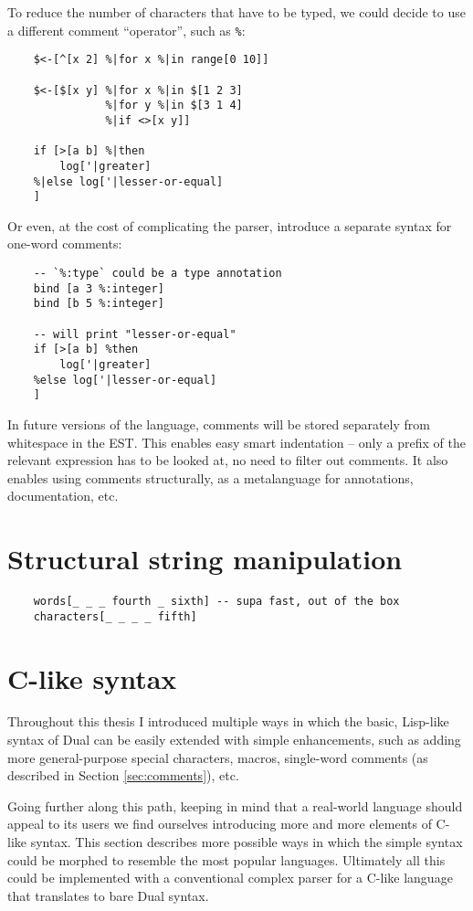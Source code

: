 To reduce the number of characters that have to be typed, we could decide to use a different comment ``operator'', such as \texttt{\%}:
\begin{lstlisting}
    $<-[^[x 2] %|for x %|in range[0 10]]
    
    $<-[$[x y] %|for x %|in $[1 2 3]
               %|for y %|in $[3 1 4]
               %|if <>[x y]]

    if [>[a b] %|then
        log['|greater]
    %|else log['|lesser-or-equal]
    ]
\end{lstlisting}

Or even, at the cost of complicating the parser, introduce a separate syntax for one-word comments:
\begin{lstlisting}
    -- `%:type` could be a type annotation 
    bind [a 3 %:integer]
    bind [b 5 %:integer]

    -- will print "lesser-or-equal"
    if [>[a b] %then
        log['|greater]
    %else log['|lesser-or-equal]
    ]
\end{lstlisting}

In future versions of the language, comments will be stored separately from whitespace in the EST. This enables easy smart indentation -- only a prefix of the relevant expression has to be looked at, no need to filter out comments. It also enables using comments structurally, as a metalanguage for annotations, documentation, etc.

\section{Structural string manipulation}
\begin{lstlisting}
    words[_ _ _ fourth _ sixth] -- supa fast, out of the box
    characters[_ _ _ _ fifth]
\end{lstlisting}
 
\section{C-like syntax}
Throughout this thesis I introduced multiple ways in which the basic, Lisp-like syntax of Dual can be easily extended with simple enhancements, such as adding more general-purpose special characters, macros, single-word comments (as described in Section \ref{sec:comments}), etc.

Going further along this path, keeping in mind that a real-world language should appeal to its users we find ourselves introducing more and more elements of C-like syntax. This section describes more possible ways in which the simple syntax could be morphed to resemble the most popular languages.
Ultimately all this could be implemented with a conventional complex parser for a C-like language that translates to bare Dual syntax.

